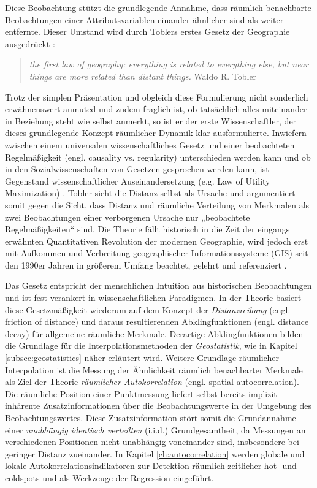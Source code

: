 Diese Beobachtung stützt die grundlegende Annahme, dass räumlich benachbarte Beobachtungen einer Attributsvariablen einander ähnlicher 
sind als weiter entfernte. Dieser Umstand wird durch Toblers erstes Gesetz der Geographie 
ausgedrückt \cite[S.234]{tobler_computer_1970}:
\begin{quotation}
    \glqq […] \textit{the first law of geography: everything is related to everything else, 
    but near things are more related than distant things.}\grqq{} Waldo R. Tobler
\end{quotation}
Trotz der simplen Präsentation und obgleich diese Formulierung nicht sonderlich erwähnenswert 
anmuted und zudem fraglich ist, ob tatsächlich 
\glqq alles miteinander in Beziehung steht\grqq{} wie \cite{tobler_first_2004} selbst anmerkt, 
so ist er der erste Wissenschaftler, der dieses grundlegende Konzept 
räumlicher Dynamik klar ausformulierte. 
Inwiefern zwischen einem universalen wissenschaftliches Gesetz und einer beobachteten 
Regelmäßigkeit (engl. causality vs. regularity) unterschieden werden kann und ob in 
den Sozialwissenschaften von Gesetzen gesprochen werden kann, ist Gegenstand 
wissenschaftlicher Auseinandersetzung (e.g. Law of Utility Maximization) \cite[]{goodchild_validity_2004}. 
Tobler sieht die Distanz selbst als Ursache und argumentiert somit gegen die Sicht, 
dass Distanz und räumliche Verteilung von Merkmalen als zwei Beobachtungen einer 
verborgenen Ursache nur „beobachtete Regelmäßigkeiten“ sind. 
Die Theorie fällt historisch in die Zeit der eingangs erwähnten Quantitativen Revolution der 
modernen Geographie, wird jedoch erst mit Aufkommen und Verbreitung 
geographischer Informationssysteme (GIS) seit den 1990er Jahren in größerem Umfang 
beachtet, gelehrt und referenziert \cite[]{sui_toblers_2004}. 

Das Gesetz entspricht der menschlichen Intuition aus historischen 
Beobachtungen und ist fest verankert in wissenschaftlichen Paradigmen. 
In der Theorie basiert diese Gesetzmäßigkeit wiederum auf dem Konzept 
der \emph{Distanzreibung} (engl. friction of distance) 
und daraus resultierenden Abklingfunktionen (engl. distance decay) für allgemeine räumliche Merkmale. 
Derartige Abklingfunktionen bilden die Grundlage für die Interpolationsmethoden der \emph{Geostatistik}, 
wie in Kapitel \ref{subsec:geostatistics} näher erläutert wird.
Weitere Grundlage räumlicher Interpolation ist die Messung der Ähnlichkeit räumlich benachbarter Merkmale 
als Ziel der Theorie \emph{räumlicher Autokorrelation} (engl. spatial autocorrelation). 
Die räumliche Position einer Punktmessung liefert selbst bereits implizit inhärente Zusatzinformationen 
über die Beobachtungswerte in der Umgebung des Beobachtungswertes. 
Diese Zusatzinformation stört somit die Grundannahme einer \emph{unabhängig identisch verteilten} (i.i.d.) Grundgesamtheit, 
da Messungen an verschiedenen Positionen nicht unabhängig voneinander sind, insbesondere bei geringer Distanz zueinander. 
In Kapitel \ref{ch:autocorrelation} werden globale und lokale Autokorrelationsindikatoren zur 
Detektion räumlich-zeitlicher hot- und coldspots und als Werkzeuge der Regression eingeführt. \\

